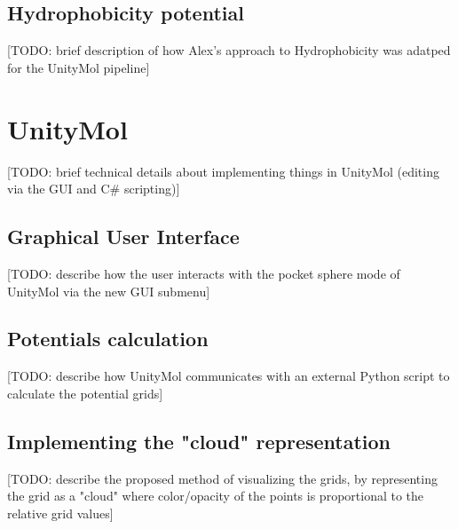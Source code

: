   \subsection{Hydrophobicity potential}
    [TODO: brief description of how Alex's approach to Hydrophobicity was adatped for the UnityMol pipeline]


\section{UnityMol}
  [TODO: brief technical details about implementing things in UnityMol (editing via the GUI and C\# scripting)]

  \subsection{Graphical User Interface}
    [TODO: describe how the user interacts with the pocket sphere mode of UnityMol via the new GUI submenu]

  \subsection{Potentials calculation}
    [TODO: describe how UnityMol communicates with an external Python script to calculate the potential grids]

  \subsection{Implementing the "cloud" representation}
    [TODO: describe the proposed method of visualizing the grids, by representing the grid as a "cloud" where color/opacity of the points is proportional to the relative grid values]


